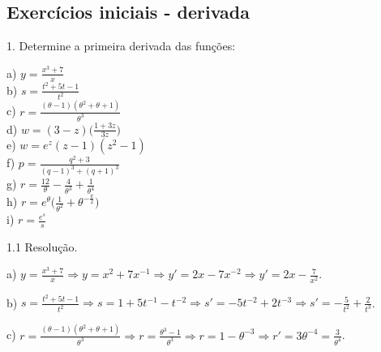 \documentclass{article}
\begin{document}
{\begin{newpage}
\subsection{Exercícios iniciais - derivada}
\par
\vspace{0.3cm}
\begin{flushleft}
1. Determine a primeira derivada das funções:
\end{flushleft}
\par
\begin{multicols}{3}
\hspace{-15pt}a) $y=\displaystyle{\frac{x^3 + 7}{x}}$\\
b) $s=\displaystyle{\frac{t^2 + 5t - 1}{t^2}}$\\
c) $r=\displaystyle{\frac{(\theta - 1)(\theta^{2} + \theta + 1)}{\theta^{3}}}$\\
d) $w=(3-z)\bigg(\displaystyle{\frac{1+3z}{3z}}\bigg)$ \\
e) $w=e^{z}(z-1)(z^2 - 1)$\\
f) $p=\displaystyle{\frac{q^2 + 3}{(q-1)^3 + (q+1)^3}}$\\
g) $r=\displaystyle{\frac{12}{\theta }} - \displaystyle{\frac{4}{\theta^{3}}} + \displaystyle{\frac{1}{\theta^{4}}}$\\
h) $r=e^{\theta }\Big(\displaystyle{\frac{1}{\theta^{2}}} + \theta^{-\frac{\pi }{2}}\Big)$ \\
i) $r=\displaystyle{\frac{e^s}{s}}$
\end{multicols}
\par
\vspace{0.3cm}
\begin{flushleft}
1.1 Resolução.
\end{flushleft}
\par
a) $y=\displaystyle{\frac{x^3 + 7}{x}}\Rightarrow y=x^2 + 7x^{-1} \Rightarrow y'=2x-7x^{-2} \Rightarrow y'=2x-\displaystyle{\frac{7}{x^2}}        $.
\par
\vspace{0.3cm}
b) $s=\displaystyle{\frac{t^2 + 5t - 1}{t^2}} \Rightarrow s=1 + 5t^{-1} - t^{-2} \Rightarrow s'=-5t^{-2} + 2t^{-3} \Rightarrow s'=-\displaystyle{\frac{5}{t^2}} + \displaystyle{\frac{2}{t^3}}$.
\par
\vspace{0.3cm}
c) $r=\displaystyle{\frac{(\theta - 1)(\theta^{2} + \theta + 1)}{\theta^{3}}} \Rightarrow r=\displaystyle{\frac{\theta^{3} - 1}{\theta^{3}}} \Rightarrow r=1-\theta^{-3} \Rightarrow r'=3\theta^{-4} = \displaystyle{\frac{3}{\theta^{4}}}$.

\end{newpage}}
\end{document}
